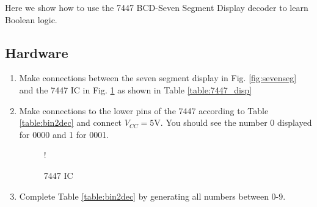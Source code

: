 Here we show how to use the 7447 BCD-Seven Segment Display decoder to learn Boolean logic.
\subsection{Hardware}
\begin{enumerate}[label=\arabic*.,ref=\theenumi]
\item
Make connections between the seven segment display in Fig. \ref{fig:sevenseg} and the  7447 IC in Fig. \ref{fig:7447} as shown in Table \ref{table:7447_disp}
%
\iffalse
\begin{table}[H]
\centering

\caption{7447 components}
\label{table:components-7447}
\end{table}
\fi
%
\begin{table}[H]
\centering

\caption{}
\label{table:7447_disp}
\end{table}
%
\iffalse
\begin{figure}[H]
\begin{center}
\resizebox {0.5\columnwidth} {!} {

}
\end{center}
\caption{}
\label{fig:sevenseg}
\end{figure}
\fi
\item
Make connections to the lower pins of the 7447 according to
Table \ref{table:bin2dec} and connect $V_{CC} = 5$V. You should see the number 0 displayed for 0000 and 1 for 0001.

%
\begin{table}[H]
\centering

\caption{}
\label{table:bin2dec}
\end{table}
%
\begin{figure}[H]
	\centering
\resizebox {\columnwidth} {!} {

}
\caption{7447 IC}
\label{fig:7447}
\end{figure}
%
\item
Complete Table \ref{table:bin2dec} by generating all numbers between 0-9.

	\end{enumerate}
